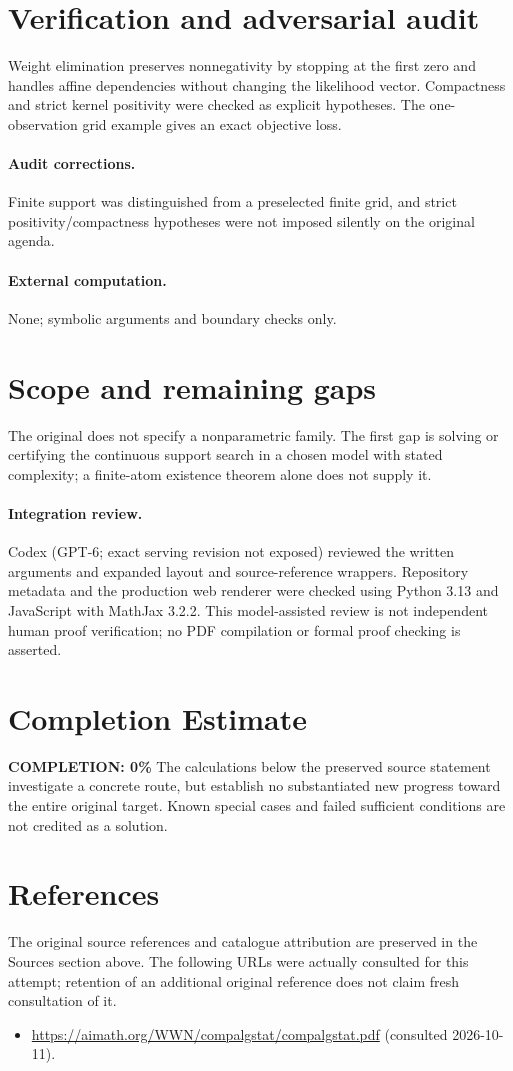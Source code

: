 \documentclass[11pt]{article}
\begin{document}
\section{Verification and adversarial audit}
Weight elimination preserves nonnegativity by stopping at the first zero
and handles affine dependencies without changing the likelihood vector.
Compactness and strict kernel positivity were checked as explicit hypotheses.
The one-observation grid example gives an exact objective loss.
\paragraph{Audit corrections.} Finite support was distinguished from a preselected finite grid, and strict positivity/compactness hypotheses were not imposed silently on the original agenda.
\paragraph{External computation.} None; symbolic arguments and boundary checks only.
\section{Scope and remaining gaps}
The original does not specify a nonparametric family. The first gap is
solving or certifying the continuous support search in a chosen model with
stated complexity; a finite-atom existence theorem alone does not supply it.
\paragraph{Integration review.} Codex (GPT-6; exact serving revision not exposed) reviewed the written arguments and expanded layout and source-reference wrappers. Repository metadata and the production web renderer were checked using Python 3.13 and JavaScript with MathJax 3.2.2. This model-assisted review is not independent human proof verification; no PDF compilation or formal proof checking is asserted.

\section{Completion Estimate}
\noindent\textbf{COMPLETION: 0\%}
The calculations below the preserved source statement investigate a concrete route,
but establish no substantiated new progress toward the entire original target.
Known special cases and failed sufficient conditions are not credited as a solution.
\section{References}
The original source references and catalogue attribution are preserved in the
Sources section above. The following URLs were actually consulted for this attempt;
retention of an additional original reference does not claim fresh consultation of it.
\begin{itemize}
\item \url{https://aimath.org/WWN/compalgstat/compalgstat.pdf} (consulted 2026-10-11). 
\end{itemize}
\end{document}
